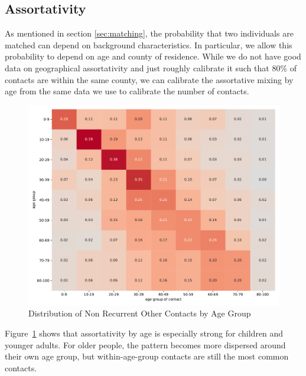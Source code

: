 \subsection{Assortativity}
\label{subsec:assortativity}

As mentioned in section \ref{sec:matching}, the probability that two individuals are
matched can depend on background characteristics. In particular, we allow this
probability to depend on age and county of residence. While we do not have good data on
geographical assortativity and just roughly calibrate it such that 80\% of contacts are
within the same county, we can calibrate the assortative mixing by age from the same data
we use to calibrate the number of contacts.

\begin{figure}[ht]
    \centering
    \includegraphics[width=0.9 \textwidth]{figures/results/figures/data/assortativity_other_non_recurrent}
    \caption{Distribution of Non Recurrent Other Contacts by Age Group}
    \label{fig:assortativity_other}
\end{figure}


Figure~\ref{fig:assortativity_other} shows that assortativity by age is especially strong
for children and younger adults. For older people, the pattern becomes more dispersed
around their own age group, but within-age-group contacts are still the most common
contacts.

